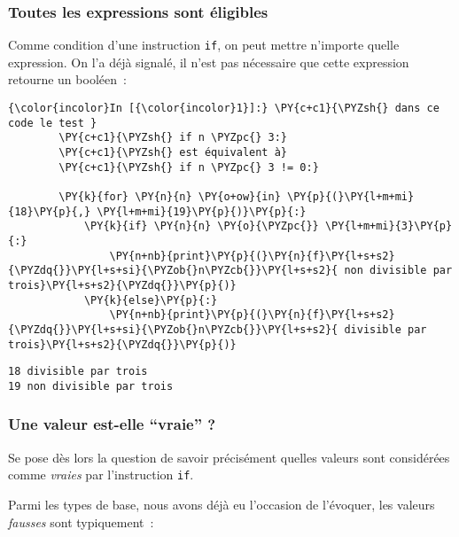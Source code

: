     \hypertarget{toutes-les-expressions-sont-uxe9ligibles}{%
\subsubsection{Toutes les expressions sont
éligibles}\label{toutes-les-expressions-sont-uxe9ligibles}}

    Comme condition d'une instruction \texttt{if}, on peut mettre n'importe
quelle expression. On l'a déjà signalé, il n'est pas nécessaire que
cette expression retourne un booléen~:

    \begin{Verbatim}[commandchars=\\\{\}]
{\color{incolor}In [{\color{incolor}1}]:} \PY{c+c1}{\PYZsh{} dans ce code le test }
        \PY{c+c1}{\PYZsh{} if n \PYZpc{} 3:}
        \PY{c+c1}{\PYZsh{} est équivalent à}
        \PY{c+c1}{\PYZsh{} if n \PYZpc{} 3 != 0:}
        
        \PY{k}{for} \PY{n}{n} \PY{o+ow}{in} \PY{p}{(}\PY{l+m+mi}{18}\PY{p}{,} \PY{l+m+mi}{19}\PY{p}{)}\PY{p}{:}
            \PY{k}{if} \PY{n}{n} \PY{o}{\PYZpc{}} \PY{l+m+mi}{3}\PY{p}{:}
                \PY{n+nb}{print}\PY{p}{(}\PY{n}{f}\PY{l+s+s2}{\PYZdq{}}\PY{l+s+si}{\PYZob{}n\PYZcb{}}\PY{l+s+s2}{ non divisible par trois}\PY{l+s+s2}{\PYZdq{}}\PY{p}{)}
            \PY{k}{else}\PY{p}{:}
                \PY{n+nb}{print}\PY{p}{(}\PY{n}{f}\PY{l+s+s2}{\PYZdq{}}\PY{l+s+si}{\PYZob{}n\PYZcb{}}\PY{l+s+s2}{ divisible par trois}\PY{l+s+s2}{\PYZdq{}}\PY{p}{)}
\end{Verbatim}


    \begin{Verbatim}[commandchars=\\\{\}]
18 divisible par trois
19 non divisible par trois

    \end{Verbatim}

    \hypertarget{une-valeur-est-elle-vraie}{%
\subsubsection{Une valeur est-elle ``vraie''
?}\label{une-valeur-est-elle-vraie}}

    Se pose dès lors la question de savoir précisément quelles valeurs sont
considérées comme \emph{vraies} par l'instruction \texttt{if}.

Parmi les types de base, nous avons déjà eu l'occasion de l'évoquer, les
valeurs \emph{fausses} sont typiquement~:

